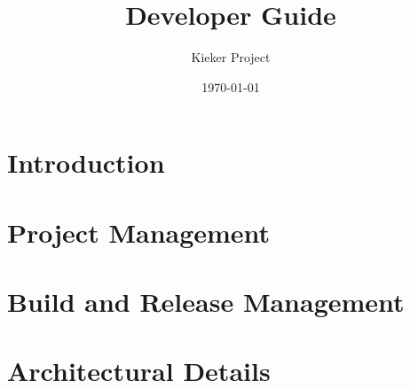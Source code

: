 \documentclass[a4paper, oneside, 11pt, pointlessnumbers, headsepline]{scrbook}
\title{%
\Huge\Kieker{} \version{} Developer Guide%
}
\author{\sffamily Kieker Project}
\date{\sffamily\today}
\begin{document}
  \maketitle
  \tableofcontents

\chapter{Introduction}


\chapter{Project Management}


\chapter{Build and Release Management}


\chapter{Architectural Details}

\end{document}

